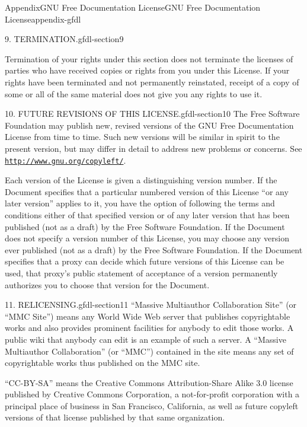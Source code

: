 \documentclass[oneside,10pt,]{book}
\numberwithin{equation}{section}
\begin{document}
\begin{appendixptx}{Appendix}{GNU Free Documentation License}{}{GNU Free Documentation License}{}{}{appendix-gfdl}
\begin{paragraphs}{9. TERMINATION.}{gfdl-section9}
\par
Termination of your rights under this section does not terminate the licenses of parties who have received copies or rights from you under this License. If your rights have been terminated and not permanently reinstated, receipt of a copy of some or all of the same material does not give you any rights to use it.%
\end{paragraphs}%
\begin{paragraphs}{10. FUTURE REVISIONS OF THIS LICENSE.}{gfdl-section10}%
The Free Software Foundation may publish new, revised versions of the GNU Free Documentation License from time to time. Such new versions will be similar in spirit to the present version, but may differ in detail to address new problems or concerns. See \href{http://www.gnu.org/copyleft/}{\nolinkurl{http://www.gnu.org/copyleft/}}.%
\par
Each version of the License is given a distinguishing version number. If the Document specifies that a particular numbered version of this License ``or any later version'' applies to it, you have the option of following the terms and conditions either of that specified version or of any later version that has been published (not as a draft) by the Free Software Foundation. If the Document does not specify a version number of this License, you may choose any version ever published (not as a draft) by the Free Software Foundation. If the Document specifies that a proxy can decide which future versions of this License can be used, that proxy's public statement of acceptance of a version permanently authorizes you to choose that version for the Document.%
\end{paragraphs}%
\begin{paragraphs}{11. RELICENSING.}{gfdl-section11}%
``Massive Multiauthor Collaboration Site'' (or ``MMC Site'') means any World Wide Web server that publishes copyrightable works and also provides prominent facilities for anybody to edit those works. A public wiki that anybody can edit is an example of such a server. A ``Massive Multiauthor Collaboration'' (or ``MMC'') contained in the site means any set of copyrightable works thus published on the MMC site.%
\par
``CC-BY-SA'' means the Creative Commons Attribution-Share Alike 3.0 license published by Creative Commons Corporation, a not-for-profit corporation with a principal place of business in San Francisco, California, as well as future copyleft versions of that license published by that same organization.%
\par

\end{paragraphs}
\end{appendixptx}
\end{document}

